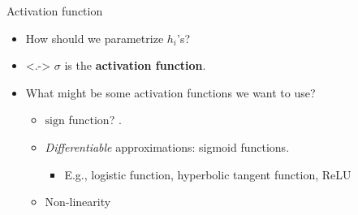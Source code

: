 \documentclass[usenames,dvipsnames,notes,11pt,aspectratio=169]{beamer}
\newcommand{\pdfnote}[1]{}
\begin{document}
\begin{frame}
{Activation function}
\begin{itemize}[<+->]
\item How should we parametrize $h_i$'s? 
\item<.-> $\sigma$ is the \textbf{activation function}.
\item What might be some activation functions we want to use?
\begin{itemize}
\item $\text{sign}$ function? .
\item \emph{Differentiable} approximations: sigmoid functions.
\begin{itemize}[<.->]
\item E.g., logistic function, hyperbolic tangent function, ReLU
\end{itemize}
\item Non-linearity
\end{itemize}
\end{itemize}
\pdfnote{Recall that $h$ is an intermediate predictor. How about the sign function such that $h$ would output the result of a binary classifier.}
\pdfnote{Sigmoid function is S-shaped functions that approximate sign function. (draw)}
\pdfnote{Let's write down our two-layer network. In the output layer, we have a linear combination of the hidden units. Each hidden units compute a linear combination of its inputs followed by an activation function.}
\pdfnote{Without the activation function this is just a linear model. What do we gain from these nonlinear activation functions? Let's look at how well a two layer NN approximate different functions.}
\end{frame}
\end{document}
